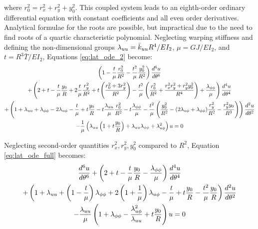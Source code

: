 \documentclass[\rootdir/thesis.tex]{subfiles}
\begin{document}
where $r_0^2 = r_x^2+r_y^2+y_0^2$. This coupled system leads to an eighth-order ordinary differential equation with constant coefficients and all even order derivatives. Analytical formulae for the roots are possible, but impractical due to the need to find roots of a quartic characteristic polynomial. Neglecting warping stiffness and defining the non-dimensional groups $\lambda_{uu}=\bar{k}_{uu} R^4/EI_2$, $\mu=GJ/EI_2$, and $t=R^3\bar{T}/EI_2$, Equations \eqref{eq:lat_ode_2} become:
\begin{multline}
\label{eq:lat_ode_full}
  \left(1-\frac{t}{\mu}\frac{r_0^2}{R^2} - \frac{t^2}{\mu}\frac{y_0^2}{R^2}\right)\frac{d^6u}{d\theta^6}\\
  +\left(2+t-\frac{t}{\mu}\frac{y_0}{R} + 2\frac{t}{\mu}\frac{r_y^2}{R^2}
         +t\left(\frac{r_0^2 + 3r_y^2}{R^2}\right)
         -\frac{t^2}{\mu}\left(\frac{r_0^2}{R^2}+\frac{r_x^2r_y^2+r_y^2y_0^2}{R^4}\right)
         +\frac{\lambda_{\phi\phi}}{\mu}\right) \frac{d^4u}{d\theta^4}\\
  +\left(1+\lambda_{uu}+\lambda_{\phi\phi}-2\lambda_{u\phi}
         -\frac{t}{\mu}+t\frac{y_0}{R}-t\frac{\lambda_{uu}}{\mu}\frac{r_0^2}{R^2}
         -t\frac{\lambda_{\phi\phi}}{\mu}
         -\frac{t^2}{\mu}\left(\frac{y_0^2}{R^2}-(2\lambda_{u\phi}+\lambda_{\phi\phi})\frac{r_y^2}{R^2} - \frac{r_y^2y_0}{R^3}\right)
         \right)\frac{d^2u}{d\theta^2}\\
  -\frac{1}{\mu}\left(\lambda_{uu}\left(1+t\frac{y_0}{R}\right)
                      +\lambda_{uu}\lambda_{\phi\phi} + \lambda_{u\phi}^2\right)u = 0
\end{multline}

Neglecting second-order quantities $r_x^2,r_y^2,y_0^2$ compared to $R^2$, Equation \eqref{eq:lat_ode_full} becomes:
\begin{multline}
\label{eq:lat_ode}
  \frac{d^6u}{d\theta^6}
  +\left(2 + t - \frac{t}{\mu}\frac{y_0}{R}
         -\frac{\lambda_{\phi\phi}}{\mu}\right) \frac{d^4u}{d\theta^4}\\
  +\left(1 + \lambda_{uu} + \left(1-\frac{t}{\mu}\right)\lambda_{\phi\phi}
         +2\left(1 + \frac{1}{\mu}\right)\lambda_{u\phi}
         -\frac{t}{\mu}+t\frac{y_0}{R}
         -\frac{t^2}{\mu}\frac{y_0}{R}\right)\frac{d^2u}{d\theta^2}\\
  -\frac{\lambda_{uu}}{\mu}\left(1+\lambda_{\phi\phi}
                                 -\frac{\lambda_{u\phi}^2}{\lambda_{uu}}
                                 +t\frac{y_0}{R}\right)u = 0
\end{multline}
\end{document}
